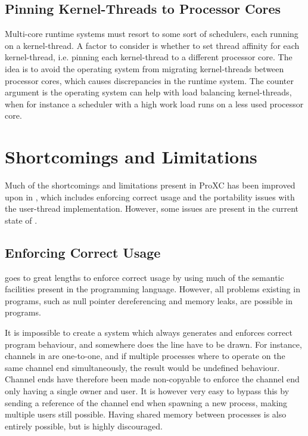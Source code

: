 \section{Pinning Kernel\hyp{}Threads to Processor Cores}


Multi\hyp{}core runtime systems must resort to some sort of schedulers, each running on a kernel\hyp{}thread. A factor to consider is whether to set thread affinity for each kernel\hyp{}thread, i.e. pinning each kernel\hyp{}thread to a different processor core. The idea is to avoid the operating system from migrating kernel\hyp{}threads between processor cores, which causes discrepancies in the runtime system. The counter argument is the operating system can help with load balancing kernel\hyp{}threads, when for instance a scheduler with a high work load runs on a less used processor core.


\chapter{Shortcomings and Limitations}
\label{ch:shortcomings_limitations}


Much of the shortcomings and limitations present in ProXC has been improved upon in \Proxc{}, which includes enforcing correct usage and the portability issues with the user\hyp{}thread implementation. However, some issues are present in the current state of \Proxc{}.


\section{Enforcing Correct Usage}


\Proxc{} goes to great lengths to enforce correct usage by using much of the semantic facilities present in the \Cpp{} programming language. However, all problems existing in \Cpp{} programs, such as null pointer dereferencing and memory leaks, are possible in \Proxc{} programs.  

It is impossible to create a system which always generates and enforces correct program behaviour, and somewhere does the line have to be drawn. For instance, channels in \Proxc{} are one\hyp{}to\hyp{}one, and if multiple processes where to operate on the same channel end simultaneously, the result would be undefined behaviour. Channel ends have therefore been made non\hyp{}copyable to enforce the channel end only having a single owner and user. It is however very easy to bypass this by sending a reference of the channel end when spawning a new process, making multiple users still possible. Having shared memory between processes is also entirely possible, but is highly discouraged.

